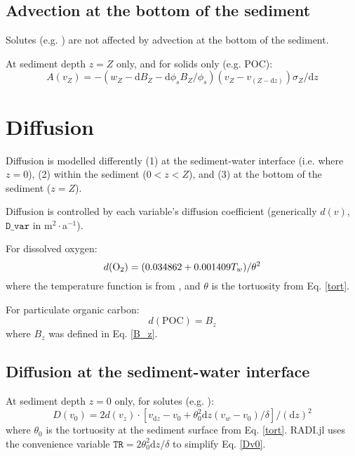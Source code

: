 \documentclass[a4paper]{article}
\newcommand{\D}[1]{\mathrm{d}#1}
\newcommand{\code}[1]{\texttt{#1}}
\begin{document}
\subsection{Advection at the bottom of the sediment}\label{sx:adv_bot}

Solutes (e.g. ) are not affected by advection at the bottom of the sediment.

At sediment depth $z = Z$ only, and for solids only (e.g. POC):
\begin{equation}
A(v_Z) = -(w_Z - \D{B_Z} - \D{\phi_s} B_Z / \phi_s) (v_Z - v_{(Z-\D{z})}) \sigma_Z / \D{z}
\end{equation}

\section{Diffusion}\label{sx:diff}

Diffusion is modelled differently (1) at the sediment-water interface (i.e. where $z = 0$), (2) within the sediment ($0 < z < Z$), and (3) at the bottom of the sediment ($z = Z$).

Diffusion is controlled by each variable's diffusion coefficient (generically $d(v)$, $\code{D\_var}$ in m$^2\cdot$a$^{-1}$).

For dissolved oxygen:
\begin{equation}
d(\ce{O2}) = (0.034862 + 0.001409 T_w) / \theta^2
\end{equation}
where the temperature function is from \citet{li_diffusion_1974}, and $\theta$ is the tortuosity from Eq. \eqref{tort}.

For particulate organic carbon:
\begin{equation}
d(\mathrm{POC}) = B_z
\end{equation}
where $B_z$ was defined in Eq. \eqref{B_z}.

\subsection{Diffusion at the sediment-water interface}\label{sx:diff_swi}

At sediment depth $z = 0$ only, for solutes (e.g. ):
\begin{equation}\label{Dv0}
D(v_0) = 2 d(v_z) \cdot [v_{\D{z}} - v_0 + \theta_0^2 \D{z} (v_w - v_0) / \delta] / (\D{z})^2
\end{equation}
where $\theta_0$ is the tortuosity at the sediment surface from Eq. \eqref{tort}. RADI.jl uses the convenience variable $\code{TR} = 2 \theta_0^2 \D{z} / \delta$ to simplify Eq. \eqref{Dv0}.
\end{document}
